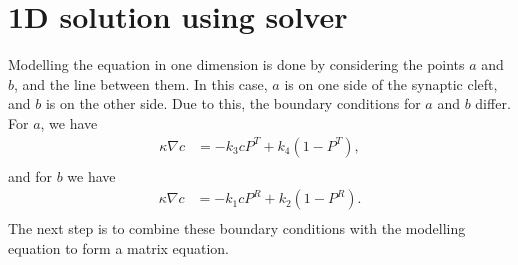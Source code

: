 \documentclass[11pt, a4paper]{article}\usepackage[]{graphicx}\usepackage[]{color}
\begin{document}
\section*{1D solution using solver}
Modelling the equation in one dimension is done by considering the points $a$ and $b$, and the line between them.  In this case, $a$ is on one side of the synaptic cleft, and $b$ is on the other side.  Due to this, the boundary conditions for $a$ and $b$ differ.  For $a$, we have 
\begin{align*}
\kappa \nabla c &= -{k}_3cP^T + {k}_4(1-P^T),\\
\end{align*}
and for $b$ we have
\begin{align*}
\kappa \nabla c &= -{k}_1c P^R + {k}_2(1-P^R).\\
\end{align*}
The next step is to combine these boundary conditions with the modelling equation to form a matrix equation.
\end{document}
